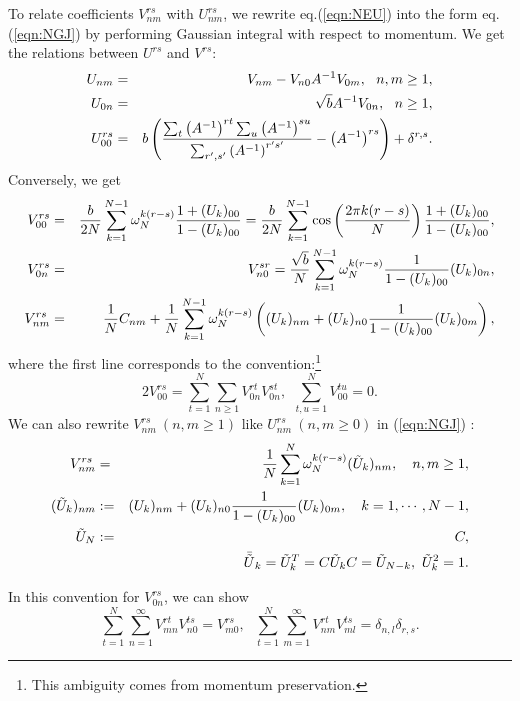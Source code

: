 \documentclass[12pt,a4paper]{article}
\begin{document}
To relate coefficients $V^{rs}_{nm}$ with $U^{rs}_{nm}$, we rewrite eq.(\ref{eqn:NEU}) into the form eq.(\ref{eqn:NGJ}) by performing Gaussian integral with respect to momentum. We get the relations between $U^{rs}$ and $V^{rs}$:
\begin{eqnarray}
U_{nm}&=&V_{nm}-V_{n0}A^{-1}V_{0m}, \ \ n,m\geq1,\nonumber \\
U_{0n}&=&\sqrt bA^{-1}V_{0n},\ \ n\geq1,\nonumber\\
U_{00}^{rs}&=&b\left({\sum_t\left(A^{-1}\right)^{rt}\sum_u\left(A^{-1}\right)^{su}\over\sum_{r',s'}\left(A^{-1}\right)^{r's'}}-\left(A^{-1}\right)^{rs}\right)+\delta^{r,s}.
\end{eqnarray}
Conversely, we get
\begin{eqnarray}
V_{00}^{rs}&=&{b\over2N}\sum_{k=1}^{N-1}\omega_N^{k(r-s)} {1+(U_k)_{00}\over1-(U_k)_{00}}
={b\over2N}\sum_{k=1}^{N-1}\cos\left({2\pi k(r-s)\over N}\right) {1+(U_k)_{00}\over1-(U_k)_{00}},\nonumber \\
V_{0n}^{rs}&=&V_{n0}^{sr}={\sqrt b\over N}\sum_{k=1}^{N-1}\omega_N^{k(r-s)}{1\over1-(U_k)_{00}}(U_k)_{0n}, \nonumber \\
V_{nm}^{rs}&=&{1\over N}C_{nm}+{1\over N}\sum_{k=1}^{N-1}\omega_N^{k(r-s)}\left((U_k)_{nm}+(U_k)_{n0}{1\over1-(U_k)_{00}}(U_k)_{0m}\right),
\end{eqnarray}
where the first line corresponds to the convention:\footnote{
	This ambiguity comes from momentum preservation.
}
\begin{equation}
2V_{00}^{rs}=\sum_{t=1}^N\sum_{n\geq1}V_{0n}^{rt}V_{0n}^{st},\ \ \sum_{t,u=1}^N V_{00}^{tu}=0.
\end{equation}
We can also rewrite $V^{rs}_{nm}\ (n,m\geq1)$ like $U^{rs}_{nm}\ (n,m\geq0)$ in (\ref{eqn:NGJ}) :
\begin{eqnarray}
V_{nm}^{rs}&=&{1\over N}\sum_{k=1}^N\omega_N^{k(r-s)}({\tilde U}_k)_{nm},\ \ \  n,m\geq1, \nonumber \\
({\tilde U}_k)_{nm}&:=&(U_k)_{nm}+(U_k)_{n0}{1\over1-(U_k)_{00}}(U_k)_{0m},\ \ \ k=1,\cdots,N-1, \nonumber \\
{\tilde U}_N&:=&C, \nonumber \\
&&{\bar {\tilde U}}_k={\tilde U}_k^T=C{\tilde U}_kC={\tilde U}_{N-k},\ {\tilde U}_k^2=1.
\end{eqnarray}

In this convention for $V_{0n}^{rs}$, we can show
\begin{equation}
\label{eqn:VV}
\sum_{t=1}^N \sum_{n=1}^\infty V_{mn}^{rt}V_{n0}^{ts}=V_{m0}^{rs},\ \ \ 
\sum_{t=1}^N \sum_{m=1}^\infty V_{nm}^{rt}V_{ml}^{ts}=\delta_{n,l}\delta_{r,s}.
\end{equation}
\end{document}
